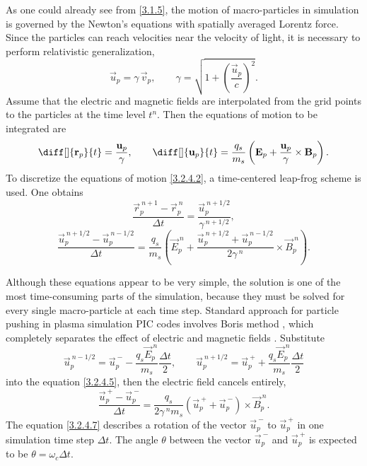 As one could already see from \ref{3.1.5}, the motion of macro-particles in simulation is governed by the Newton's equations with spatially averaged Lorentz force. Since the particles can reach velocities near the velocity of light, it is necessary to perform relativistic generalization,
\begin{equation}
\label{3.2.4.1}
\vec{u}_{p} = \gamma \, \vec{v}_{p}, \qquad \gamma = \sqrt{1 + \left( \frac{\vec{u}_{p}}{c}\right)^{2}}.
\end{equation}
Assume that the electric and magnetic fields are interpolated from the grid points to the particles at the time level $ t^{n} $. Then the equations of motion to be integrated are
\begin{equation}
\label{3.2.4.2}
\diff[]{\vec{r}_{p}}{t} = \frac{\vec{u}_{p}}{\gamma}, \qquad \diff[]{\vec{u}_{p}}{t} = \frac{q_{s}}{m_{s}} \left(\vec{E}_{p} + \frac{\vec{u}_{p}}{\gamma} \times \vec{B}_{p} \right).
\end{equation}
To discretize the equations of motion \ref{3.2.4.2}, a time-centered leap-frog scheme is used. One obtains
\begin{equation}
\label{3.2.4.4}
\frac{\vec{r}_{p}^{\:n+1} - \vec{r}_{p}^{\:n}}{\Delta t} = \frac{\vec{u}_{p}^{\:n + 1/2}}{\gamma^{\:n+1/2}},
\end{equation}
\begin{equation}
\label{3.2.4.5}
\frac{\vec{u}_{p}^{\:n+1/2} - \vec{u}_{p}^{\:n-1/2}}{\Delta t} = \frac{q_{s}}{m_{s}} \left( \vec{E}_{p}^{\:n} + \frac{\vec{u}_{p}^{\:n+1/2} + \vec{u}_{p}^{\:n-1/2}}{2 \gamma^{\:n}} \times \vec{B}_{p}^{\:n} \right).
\end{equation}

Although these equations appear to be very simple, the solution is one of the most time-consuming parts of the simulation, because they must be solved for every single macro-particle at each time step. Standard approach for particle pushing in plasma simulation PIC codes involves Boris method \cite{Boris1970, Qin2013}, which completely separates the effect of electric and magnetic fields \cite{birdsall}. Substitute
\begin{equation}
\label{3.2.4.6}
\vec{u}_{p}^{\:n-1/2} = \vec{u}_{p}^{\:-} - \frac{q_{s} \vec{E}_{p}^{\:n}}{m_{s}} \frac{\Delta t}{2}, \qquad \vec{u}_{p}^{\:n+1/2} = \vec{u}_{p}^{\:+} + \frac{q_{s} \vec{E}_{p}^{\:n}}{m_{s}} \frac{\Delta t}{2}
\end{equation}
into the equation \ref{3.2.4.5}, then the electric field cancels entirely,
\begin{equation}
\label{3.2.4.7}
\frac{\vec{u}_{p}^{\:+} - \vec{u}_{p}^{\:-}}{\Delta t} = \frac{q_{s}}{2 \gamma^{\:n} m_{s}} \left(\vec{u}_{p}^{\:+} + \vec{u}_{p}^{\:-}\right)\times \vec{B}_{p}^{\:n}. 
\end{equation}
The equation \ref{3.2.4.7} describes a rotation of the vector $ \vec{u}_{p}^{\:-} $ to $ \vec{u}_{p}^{\:+} $ in one simulation time step $ \Delta t $. The angle $ \theta $ between the vector $ \vec{u}_{p}^{\:-} $ and $ \vec{u}_{p}^{\:+} $ is expected to be $ \theta = \omega_{c} \Delta t $.

